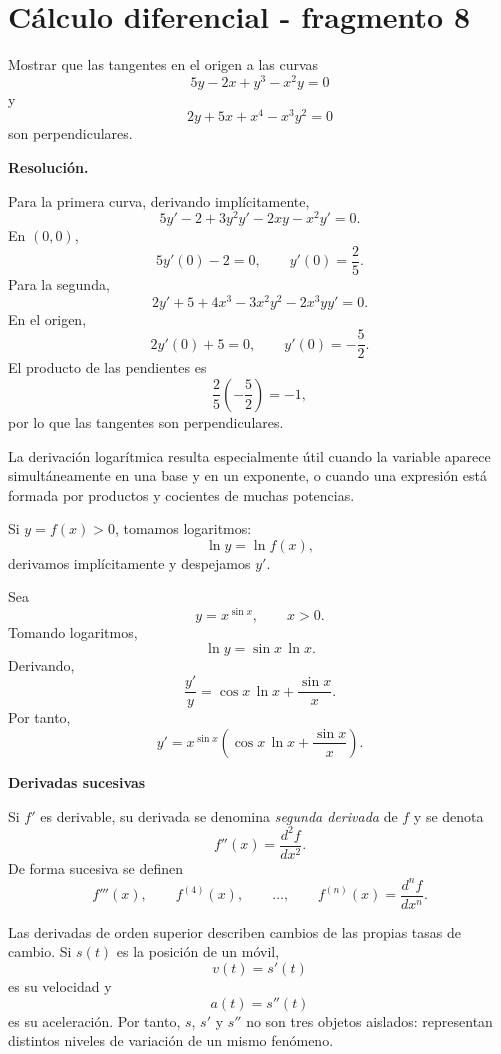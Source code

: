 \section{Cálculo diferencial - fragmento 8}
\begin{solvedexercise}
Mostrar que las tangentes en el origen a las curvas
\[
5y-2x+y^3-x^2y=0
\]
y
\[
2y+5x+x^4-x^3y^2=0
\]
son perpendiculares.

\textbf{Resolución.}\par\smallskip
Para la primera curva, derivando implícitamente,
\[
5y'-2+3y^2y'-2xy-x^2y'=0.
\]
En $(0,0)$,
\[
5y'(0)-2=0,
\qquad
y'(0)=\frac25.
\]
Para la segunda,
\[
2y'+5+4x^3-3x^2y^2-2x^3yy'=0.
\]
En el origen,
\[
2y'(0)+5=0,
\qquad
y'(0)=-\frac52.
\]
El producto de las pendientes es
\[
\frac25\left(-\frac52\right)=-1,
\]
por lo que las tangentes son perpendiculares.
\end{solvedexercise}

La derivación logarítmica resulta especialmente útil cuando la variable aparece simultáneamente en una base y en un exponente, o cuando una expresión está formada por productos y cocientes de muchas potencias.

Si $y=f(x)>0$, tomamos logaritmos:
\[
\ln y=\ln f(x),
\]
derivamos implícitamente y despejamos $y'$.

\begin{example}
Sea
\[
y=x^{\sin x},
\qquad x>0.
\]
Tomando logaritmos,
\[
\ln y=\sin x\,\ln x.
\]
Derivando,
\[
\frac{y'}{y}
=
\cos x\,\ln x+\frac{\sin x}{x}.
\]
Por tanto,
\[
\boxed{
y'=x^{\sin x}\left(\cos x\,\ln x+\frac{\sin x}{x}\right)
}.
\]
\end{example}

\textbf{Derivadas sucesivas}

Si $f'$ es derivable, su derivada se denomina \emph{segunda derivada} de $f$ y se denota
\[
f''(x)=\frac{d^2f}{dx^2}.
\]
De forma sucesiva se definen
\[
f'''(x),
\qquad
f^{(4)}(x),
\qquad
\ldots,
\qquad
f^{(n)}(x)=\frac{d^nf}{dx^n}.
\]

Las derivadas de orden superior describen cambios de las propias tasas de cambio. Si $s(t)$ es la posición de un móvil,
\[
v(t)=s'(t)
\]
es su velocidad y
\[
a(t)=s''(t)
\]
es su aceleración. Por tanto, $s$, $s'$ y $s''$ no son tres objetos aislados: representan distintos niveles de variación de un mismo fenómeno.


